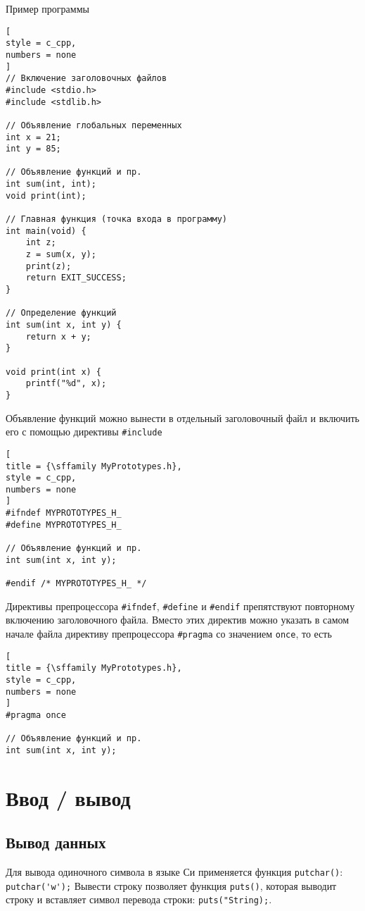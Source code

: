 \documentclass[%
	11pt,
	a4paper,
	utf8,
		]{article}
\begin{document}
Пример программы
\begin{lstlisting}[
style = c_cpp,
numbers = none
]
// Включение заголовочных файлов
#include <stdio.h>
#include <stdlib.h>

// Объявление глобальных переменных
int x = 21;
int y = 85;

// Объявление функций и пр.
int sum(int, int);
void print(int);

// Главная функция (точка входа в программу)
int main(void) {
    int z;
    z = sum(x, y);
    print(z);
    return EXIT_SUCCESS;
}

// Определение функций
int sum(int x, int y) {
    return x + y;
}

void print(int x) {
    printf("%d", x);
}
\end{lstlisting}

Объявление функций можно вынести в отдельный заголовочный файл и включить его с помощью директивы \verb|#include|
\begin{lstlisting}[
title = {\sffamily MyPrototypes.h},
style = c_cpp,
numbers = none
]
#ifndef MYPROTOTYPES_H_
#define MYPROTOTYPES_H_

// Объявление функций и пр.
int sum(int x, int y);

#endif /* MYPROTOTYPES_H_ */
\end{lstlisting}

Директивы препроцессора \verb|#ifndef|, \verb|#define| и \verb|#endif| препятствуют повторному включению заголовочного файла. Вместо этих директив можно указать в самом начале файла директиву препроцессора \verb|#pragma| со значением \verb|once|, то есть
\begin{lstlisting}[
title = {\sffamily MyPrototypes.h},
style = c_cpp,
numbers = none
]
#pragma once

// Объявление функций и пр.
int sum(int x, int y);
\end{lstlisting}

\section{Ввод / вывод}

\subsection{Вывод данных}

Для вывода одиночного символа в языке Си применяется функция \verb*|putchar()|: \verb|putchar('w');| Вывести строку позволяет функция \verb*|puts()|, которая выводит строку и вставляет символ перевода строки: \verb|puts("String);|.
\end{document}
